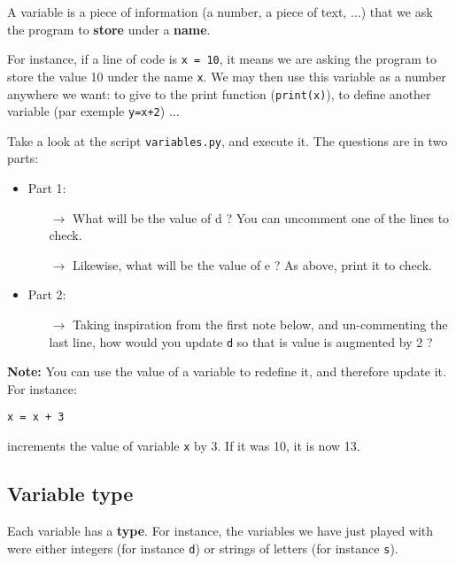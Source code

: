\documentclass{article}
\begin{document}
A variable is a piece of information (a number, a piece of text, $\dots$) that
we ask the program to \textbf{store} under a \textbf{name}.

For instance, if a line of code is \texttt{x = 10}, it means we are asking
the program to store the value 10 under the name \texttt{x}. We may then
use this variable as a number anywhere we want: to give to the print
function (\texttt{print(x)}), to define another variable (par exemple 
\texttt{y=x+2}) $\dots$

\begin{mdframed}[backgroundcolor=black!20!white]
Take a look at the script \texttt{variables.py}, and execute it. The questions
are in two parts:
\begin{itemize}
\item Part 1:
\begin{itemize}
\item[$\rightarrow$] What will be the value of d ? You can uncomment one  
of the lines to check.
\item[$\rightarrow$] Likewise, what will be the value of e ? As above,
print it to check. 
\end{itemize}
\item Part 2:
\begin{itemize}
\item[$\rightarrow$] Taking inspiration from the first note below, and
un-commenting 
the last line, how would you update \texttt{d} so that is value is augmented
by 2 ? 
\end{itemize}
\end{itemize}
\end{mdframed}

\begin{mdframed}[backgroundcolor=green!30!white]
\textbf{Note:} You can use the value of a variable to redefine it, and therefore
update it. For instance:
\begin{center}
\texttt{x = x + 3}
\end{center}
increments the value of variable \texttt{x} by 3. If it was 10, it is now 13.
\end{mdframed}

\subsection{Variable type}

Each variable has a \textbf{type}. For instance, the variables we have
just played with were either integers (for instance \texttt{d})
or strings of letters (for instance \texttt{s}).
\end{document}
